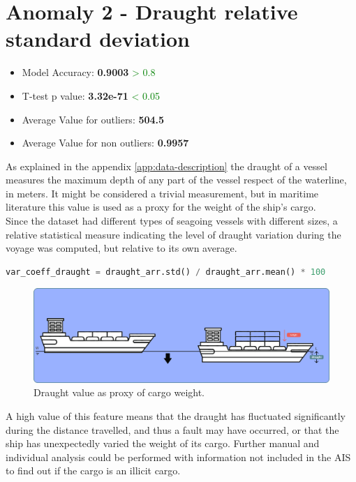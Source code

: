 \clearpage

\section{Anomaly 2 - Draught relative standard deviation}
\label{sec:anomaly-2}

\begin{itemize}
\item Model Accuracy: \textbf{0.9003} \textcolor{green}{> 0.8}
\item T-test p value: \textbf{3.32e-71} \textcolor{green}{< 0.05}
\item Average Value for outliers: \textbf{504.5}
\item Average Value for non outliers: \textbf{0.9957}
\end{itemize}

As explained in the appendix \ref{app:data-description} the draught of a vessel measures the maximum depth of any part of the vessel respect of the waterline, in meters. It might be considered a trivial measurement, but in maritime literature this value is used as a proxy for the weight of the ship's cargo.
\\
Since the dataset had different types of seagoing vessels with different sizes, a relative statistical measure indicating the level of draught variation during the voyage was computed, but relative to its own average.

\begin{lstlisting}[language=Python]
    var_coeff_draught = draught_arr.std() / draught_arr.mean() * 100
\end{lstlisting} 


\begin{figure}[H]
    \centering
    \includegraphics[width=16.5cm]{Images/3/anomaly-2.png}
    \caption{Draught value as proxy of cargo weight.}
\end{figure}

A high value of this feature means that the draught has fluctuated significantly during the distance travelled, and thus a fault may have occurred, or that the ship has unexpectedly varied the weight of its cargo. Further manual and individual analysis could be performed with information not included in the AIS to find out if the cargo is an illicit cargo.

